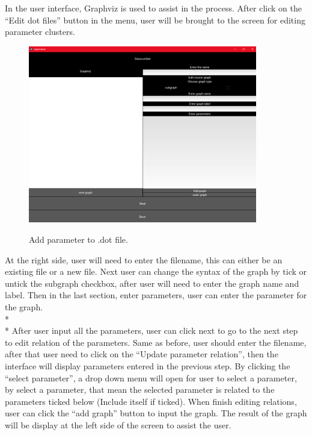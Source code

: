 \noindent 
In the user interface, Graphviz is used to assist in the process. After click on the “Edit dot files” button in the menu, user will be brought to the screen for editing parameter clusters. 
\begin{figure}[H]
	\centering
	\includegraphics[width=10cm]{figures/editDot1Screen.png}\\
	\caption{Add parameter to .dot file.}
	\label{fig:figure14}
\end{figure}
\noindent 
At the right side, user will need to enter the filename, this can either be an existing file or a new file. Next user can change the syntax of the graph by tick or untick the subgraph checkbox, after user will need to enter the graph name and label. Then in the last section, enter parameters, user can enter the parameter for the graph.\\*\\*
After user input all the parameters, user can click next to go to the next step to edit relation of the parameters. Same as before, user should enter the filename, after that user need to click on the “Update parameter relation”, then the interface will display parameters entered in the previous step. By clicking the “select parameter”, a drop down menu will open for user to select a parameter, by select a parameter, that mean the selected parameter is related to the parameters ticked below (Include itself if ticked). When finish editing relations, user can click the “add graph” button to input the graph. The result of the graph will be display at the left side of the screen to assist the user. 
